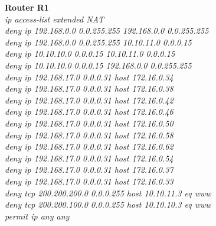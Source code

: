 \documentclass[a4paper, 12pt]{article}
\begin{document}
\hspace*{1cm}\textbf{Router R1}	\\
\hspace*{2cm}\textit{ip access-list extended NAT\\
\hspace*{2cm}deny ip 192.168.0.0 0.0.255.255 192.168.0.0 0.0.255.255\\
\hspace*{2cm}deny ip 192.168.0.0 0.0.255.255 10.10.11.0 0.0.0.15\\
\hspace*{2cm}deny ip 10.10.10.0 0.0.0.15 10.10.11.0 0.0.0.15\\
\hspace*{2cm}deny ip 10.10.10.0 0.0.0.15 192.168.0.0 0.0.255.255\\
\hspace*{2cm}deny ip 192.168.17.0 0.0.0.31 host 172.16.0.34\\
\hspace*{2cm}deny ip 192.168.17.0 0.0.0.31 host 172.16.0.38\\
\hspace*{2cm}deny ip 192.168.17.0 0.0.0.31 host 172.16.0.42\\
\hspace*{2cm}deny ip 192.168.17.0 0.0.0.31 host 172.16.0.46\\
\hspace*{2cm}deny ip 192.168.17.0 0.0.0.31 host 172.16.0.50\\
\hspace*{2cm}deny ip 192.168.17.0 0.0.0.31 host 172.16.0.58\\
\hspace*{2cm}deny ip 192.168.17.0 0.0.0.31 host 172.16.0.62\\
\hspace*{2cm}deny ip 192.168.17.0 0.0.0.31 host 172.16.0.54\\
\hspace*{2cm}deny ip 192.168.17.0 0.0.0.31 host 172.16.0.37\\
\hspace*{2cm}deny ip 192.168.17.0 0.0.0.31 host 172.16.0.33\\
\hspace*{2cm}deny tcp 200.200.200.0 0.0.0.255 host 10.10.11.3 eq www\\
\hspace*{2cm}deny tcp 200.200.100.0 0.0.0.255 host 10.10.10.3 eq www\\
\hspace*{2cm}permit ip any any\\
}
\end{document}
